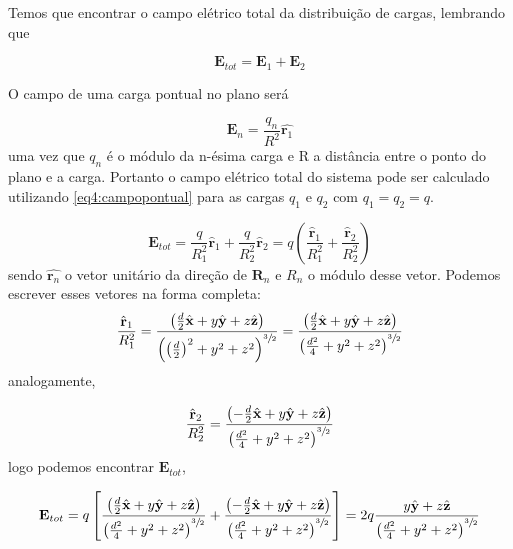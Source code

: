 Temos que encontrar o campo elétrico total da distribuição de cargas, lembrando que

\begin{equation}
	\textbf{E}_{tot} = \textbf{E}_1 + \textbf{E}_2
\end{equation}

O campo de uma carga pontual no plano será

\begin{equation}
	\textbf{E}_n = \frac{q_n}{R^2} \hat{\textbf{r}_1}
	\label{eq4:campopontual}
\end{equation}
uma vez que $q_n$ é o módulo da n-ésima carga e R a distância entre o ponto do plano e a carga. Portanto o campo elétrico total do sistema pode ser calculado utilizando \ref{eq4:campopontual} para as cargas $q_1$ e $q_2$ com $q_1 = q_2 = q$.

\begin{equation}
	\textbf{E}_{tot} = \frac{q}{ R_1^2}\hat{\textbf{r}}_1+\frac{q}{ R_2^2}\hat{\textbf{r}}_2 = q\left( \dfrac{\hat{\textbf{r}}_1}{R_1^2} + \dfrac{\hat{\textbf{r}}_2}{R_2^2}\right) 
\end{equation}
sendo $\hat{\textbf{r}_n}$ o vetor unitário da direção de $\textbf{R}_n$ e $R_n$ o módulo desse vetor. Podemos escrever esses vetores na forma completa:
\begin{equation}
	\dfrac{\hat{\textbf{r}}_1}{R_1^2} = \frac{\left( \frac{d}{2}\hat{\textbf{x}} + y\hat{\textbf{y}} + z\hat{\textbf{z}}\right)}{\left( \left( \frac{d}{2}\right)^2 + y^2 + z^2 \right)^{\sfrac{3}{2}} } = \frac{\left( \frac{d}{2}\hat{\textbf{x}} + y\hat{\textbf{y}} + z\hat{\textbf{z}}\right)}{\left(\frac{d^2}{4} + y^2 + z^2 \right)^{\sfrac{3}{2}}}
\end{equation}
analogamente,

\begin{equation}
	\dfrac{\hat{\textbf{r}}_2}{R_2^2} = \frac{\left( -\frac{d}{2}\hat{\textbf{x}} + y\hat{\textbf{y}} + z\hat{\textbf{z}}\right)}{\left(\frac{d^2}{4} + y^2 + z^2 \right)^{\sfrac{3}{2}} }
\end{equation}
logo podemos encontrar $\textbf{E}_{tot}$,

\begin{equation}
	\textbf{E}_{tot} = q\left[\frac{\left( \frac{d}{2}\hat{\textbf{x}} + y\hat{\textbf{y}} + z\hat{\textbf{z}}\right)}{\left(\frac{d^2}{4} + y^2 + z^2 \right)^{\sfrac{3}{2}}} +  \frac{\left( -\frac{d}{2}\hat{\textbf{x}} + y\hat{\textbf{y}} + z\hat{\textbf{z}}\right)}{\left(\frac{d^2}{4} + y^2 + z^2 \right)^{\sfrac{3}{2}} }\right] = 2q \frac{y\hat{\textbf{y}} + z\hat{\textbf{z}}}{\left(\frac{d^2}{4} + y^2 + z^2 \right)^{\sfrac{3}{2}} }
\end{equation}

